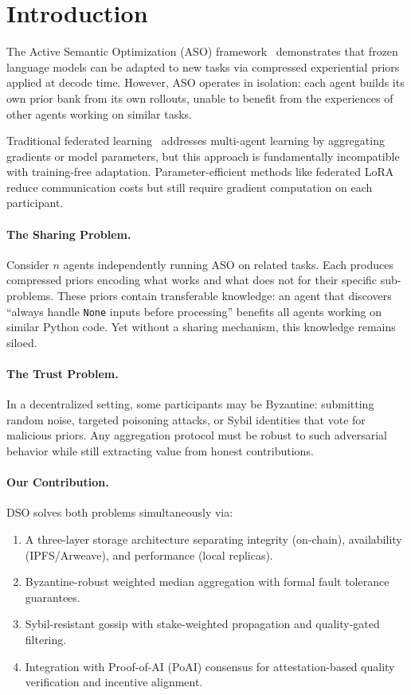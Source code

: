 \section{Introduction}

\label{sec:intro}

The Active Semantic Optimization (ASO) framework~\cite{hanzo2026aso}
demonstrates that frozen language models can be adapted to new tasks via
compressed experiential priors applied at decode time. However, ASO operates in
isolation: each agent builds its own prior bank from its own rollouts, unable to
benefit from the experiences of other agents working on similar tasks.

Traditional federated learning~\cite{mcmahan2017communication} addresses
multi-agent learning by aggregating gradients or model parameters, but this
approach is fundamentally incompatible with training-free adaptation.
Parameter-efficient methods like federated LoRA~\cite{zhang2024fedlora}
reduce communication costs but still require gradient computation on each
participant.

\paragraph{The Sharing Problem.}
Consider $n$ agents independently running ASO on related tasks. Each produces
compressed priors encoding what works and what does not for their specific
sub-problems. These priors contain transferable knowledge: an agent that
discovers ``always handle \texttt{None} inputs before processing'' benefits all
agents working on similar Python code. Yet without a sharing mechanism, this
knowledge remains siloed.

\paragraph{The Trust Problem.}
In a decentralized setting, some participants may be Byzantine: submitting
random noise, targeted poisoning attacks, or Sybil identities that vote for
malicious priors. Any aggregation protocol must be robust to such adversarial
behavior while still extracting value from honest contributions.

\paragraph{Our Contribution.}
DSO solves both problems simultaneously via:
\begin{enumerate}[leftmargin=1.5em]
    \item A three-layer storage architecture separating integrity (on-chain),
          availability (IPFS/Arweave), and performance (local replicas).
    \item Byzantine-robust weighted median aggregation with formal fault
          tolerance guarantees.
    \item Sybil-resistant gossip with stake-weighted propagation and
          quality-gated filtering.
    \item Integration with Proof-of-AI (PoAI) consensus for attestation-based
          quality verification and incentive alignment.
\end{enumerate}

